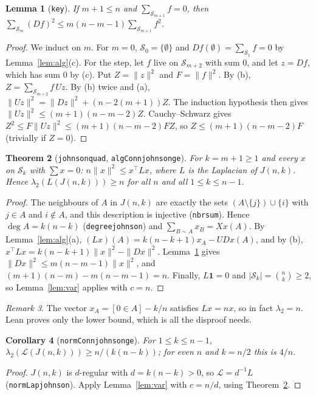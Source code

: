 \documentclass[11pt]{article}
\newtheorem{theorem}{Theorem}
\newtheorem{lemma}[theorem]{Lemma}
\newtheorem{corollary}[theorem]{Corollary}
\theoremstyle{definition}
\theoremstyle{remark}
\newtheorem{remark}[theorem]{Remark}
\renewcommand{\_}{\oldus\allowbreak}
\begin{document}
\begin{lemma}[\texttt{key}]\label{lem:key}
If $m+1\le n$ and $\sum_{\mathcal S_{m+1}}f=0$, then
$\sum_{\mathcal S_m}(Df)^2\le m(n-m-1)\sum_{\mathcal S_{m+1}}f^2$.
\end{lemma}
\begin{proof}
We induct on $m$. For $m=0$, $\mathcal S_0=\{\emptyset\}$ and $Df(\emptyset)=\sum_{\mathcal S_1}f=0$ by
Lemma~\ref{lem:alg}(c). For the step, let $f$ live on $\mathcal S_{m+2}$ with sum $0$, and let $z=Df$,
which has sum $0$ by (c). Put $Z=\|z\|^2$ and $F=\|f\|^2$. By (b), $Z=\sum_{\mathcal S_{m+2}}f\,Uz$.
By (b) twice and (a), $\|Uz\|^2=\|Dz\|^2+(n-2(m+1))Z$. The induction hypothesis then gives
$\|Uz\|^2\le (m+1)(n-m-2)Z$. Cauchy--Schwarz gives $Z^2\le F\|Uz\|^2\le(m+1)(n-m-2)FZ$, so
$Z\le(m+1)(n-m-2)F$ (trivially if $Z=0$).
\end{proof}

\begin{theorem}[\texttt{johnson\_quad}, \texttt{algConn\_johnson\_ge}]\label{thm:J}
For $k=m+1\ge1$ and every $x$ on $\mathcal S_k$ with $\sum x=0$: $n\|x\|^2\le x^\top L x$, where $L$ is
the Laplacian of $J(n,k)$. Hence $\lambda_2(L(J(n,k)))\ge n$ for all $n$ and all $1\le k\le n-1$.
\end{theorem}
\begin{proof}
The neighbours of $A$ in $J(n,k)$ are exactly the sets $(A\setminus\{j\})\cup\{i\}$ with $j\in A$ and
$i\notin A$, and this description is injective (\texttt{nbr\_sum}). Hence $\deg A=k(n-k)$
(\texttt{degree\_johnson}) and $\sum_{B\sim A}x_B=Xx(A)$. By Lemma~\ref{lem:alg}(a),
$(Lx)(A)=k(n-k+1)x_A-UDx(A)$, and by (b), $x^\top Lx=k(n-k+1)\|x\|^2-\|Dx\|^2$. Lemma~\ref{lem:key}
gives $\|Dx\|^2\le m(n-m-1)\|x\|^2$, and $(m+1)(n-m)-m(n-m-1)=n$. Finally, $L\mathbf 1=0$ and
$|\mathcal S_k|=\binom nk\ge2$, so Lemma~\ref{lem:var} applies with $c=n$.
\end{proof}

\begin{remark}
The vector $x_A=[0\in A]-k/n$ satisfies $Lx=nx$, so in fact $\lambda_2=n$. Lean proves only the lower
bound, which is all the disproof needs.
\end{remark}

\begin{corollary}[\texttt{normConn\_johnson\_ge}]
For $1\le k\le n-1$, $\lambda_2(\mathcal L(J(n,k)))\ge n/(k(n-k))$; for even $n$ and $k=n/2$ this is $4/n$.
\end{corollary}
\begin{proof}
$J(n,k)$ is $d$-regular with $d=k(n-k)>0$, so $\mathcal L=d^{-1}L$ (\texttt{normLap\_johnson}). Apply
Lemma~\ref{lem:var} with $c=n/d$, using Theorem~\ref{thm:J}.
\end{proof}
\end{document}
